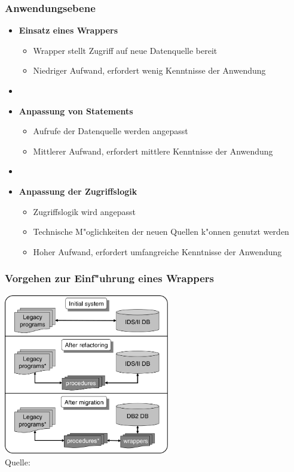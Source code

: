 \documentclass{beamer}
\begin{document}
	\begin{frame}
		\frametitle{Anwendungsebene}
		
		\begin{itemize}
			\item \textbf{Einsatz eines Wrappers} 
				\begin{itemize}
					\item Wrapper stellt Zugriff auf neue Datenquelle bereit
					\item Niedriger Aufwand, erfordert wenig Kenntnisse der Anwendung
				\end{itemize}
			\item[]
			\item \textbf{Anpassung von Statements} 
				\begin{itemize}
					\item Aufrufe der Datenquelle werden angepasst
					\item Mittlerer Aufwand, erfordert mittlere Kenntnisse der Anwendung
				\end{itemize}
			\item[]
			\item \textbf{Anpassung der Zugriffslogik}
				\begin{itemize}
					\item Zugriffslogik wird angepasst
					\item Technische M"oglichkeiten der neuen Quellen k"onnen genutzt werden
					\item Hoher Aufwand, erfordert umfangreiche Kenntnisse der Anwendung
				\end{itemize}
		\end{itemize}
	\end{frame}
	
	\begin{frame}
		\frametitle{Vorgehen zur Einf"uhrung eines Wrappers}
		
		\centering
		\includegraphics[height = 7cm]{../images/large_scale_fig_01.png} \\
		\tiny Quelle: \cite{henrard-2008}
	\end{frame}
	
\end{document}
